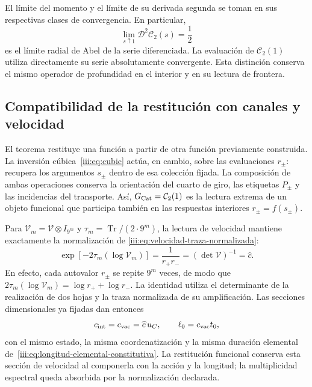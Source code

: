 El límite del momento y el límite de su derivada segunda se toman
en sus respectivas clases de convergencia. En particular,
\[
 \lim_{s\uparrow1}\mathcal D^2\mathcal C_2(s)=\frac12
\]
es el límite radial de Abel de la serie diferenciada. La evaluación
de $\mathcal C_2(1)$ utiliza directamente su serie absolutamente
convergente. Esta distinción conserva el mismo operador de profundidad
en el interior y en su lectura de frontera.

\subsection{Compatibilidad de la restitución con canales y velocidad}
\label{iii:sec:restitucion-canales-velocidad}

El teorema restituye una función a partir de otra función previamente
construida. La inversión cúbica~\eqref{iii:eq:cubic} actúa, en cambio,
sobre las evaluaciones $r_\pm$: recupera los argumentos $s_\pm$
dentro de esa colección fijada. La composición de ambas operaciones
conserva la orientación del cuarto de giro, las etiquetas $P_\pm$
y las incidencias del transporte. Así, $G_{\rm Cat}=\mathcal C_2(1)$
es la lectura extrema de un objeto funcional que participa también
en las respuestas interiores $r_\pm=f(s_\pm)$.

Para $\mathcal V_m=\mathcal V\otimes I_{9^m}$ y
$\tau_m=\operatorname{Tr}/(2\cdot9^m)$, la lectura de velocidad
mantiene exactamente la normalización de
\eqref{iii:eq:velocidad-traza-normalizada}:
\begin{equation}
 \exp[-2\tau_m(\log\mathcal V_m)]
   =\frac1{r_+r_-}
   =(\det\mathcal V)^{-1}=\widehat c.
 \label{iii:eq:restitucion-velocidad-normalizada}
\end{equation}
En efecto, cada autovalor $r_\pm$ se repite $9^m$ veces, de modo
que $2\tau_m(\log\mathcal V_m)=\log r_++\log r_-$.
La identidad utiliza el determinante de la realización de dos hojas
y la traza normalizada de su amplificación. Las secciones
dimensionales ya fijadas dan entonces
\[
 c_{\rm int}=c_{\rm vac}=\widehat c\,u_C,
 \qquad \ell_0=c_{\rm vac}t_0,
\]
con el mismo estado, la misma coordenatización y la misma duración elemental
de~\eqref{iii:eq:longitud-elemental-constitutiva}.
La restitución funcional conserva esta sección de velocidad al
componerla con la acción y la longitud; la multiplicidad espectral
queda absorbida por la normalización declarada.
